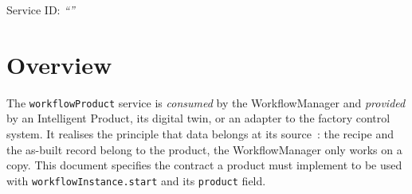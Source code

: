 \documentclass[a4paper]{arrowhead}
\begin{document}
\ArrowheadSetup

\begin{center}
  \vspace*{1cm}
  \huge{\arrowtitle}

  \vspace*{0.2cm}
  \LARGE{\arrowtype}
  \vspace*{1cm}

  \Large{Service ID: \textit{``\arrowid''}}
  \vspace*{\fill}

  

  \vspace*{1cm}
  \vspace*{\fill}

  \begin{abstract}
    This document describes the \texttt{workflowProduct} service of the Eclipse Arrowhead workflow support systems, which lets a WorkflowManager retrieve a product's recipe fragment and store the results back. It is provided by an Intelligent Product (consumed by the WorkflowManager), service version 1.0.0, documentation edition 5.4.0.
  \end{abstract}

  \vspace*{1cm}
\end{center}

\newpage

\tableofcontents
\newpage

\section{Overview}
\label{sec:overview}
The \texttt{workflowProduct} service is \emph{consumed} by the WorkflowManager and \emph{provided}
by an Intelligent Product, its digital twin, or an adapter to the factory control system. It realises the principle
that data belongs at its source~\cite{derhamy2018}: the recipe and the as-built record belong to the product, the
WorkflowManager only works on a copy. This document specifies the contract a product must implement to be used with
\texttt{workflowInstance.start} and its \texttt{product} field.
\end{document}
